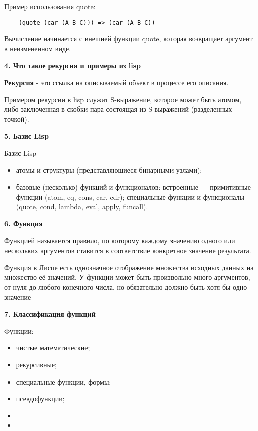 Пример использования quote:
\begin{lstlisting}
	(quote (car (A B C))) => (car (A B C))
\end{lstlisting}


Вычисление начинается с внешней функции quote, которая возвращает аргумент в неизмененном виде.

\textbf{4. Что такое рекурсия и примеры из lisp}

\textbf{Рекурсия} - это ссылка на описываемый объект в процессе его описания.

Примером рекурсии в lisp служит S-выражение, которое может быть атомом,
либо заключенная в скобки пара состоящая из S-выражений (разделенных точкой).


\textbf{5. Базис Lisp}

Базис Lisp 
\begin{itemize}
	\item атомы и структуры (представляющиеся бинарными узлами);
	\item базовые (несколько) функций и функционалов: встроенные — примитивные
	функции (atom, eq, cons, car, cdr); специальные функции и функционалы (quote,
	cond, lambda, eval, apply, funcall).
\end{itemize}

\textbf{6. Функция}

Функцией называется правило, по которому каждому значению одного или нескольких аргументов ставится в соответствие конкретное значение результата.

Функция в Лиспе есть однозначное отображение множества исходных данных на множество её значений. У функции может быть произвольно много аргументов, от нуля до любого конечного числа, но обязательно должно быть хотя бы одно значение

\textbf{7. Классификация функций}

Функции: 
\begin{itemize}
	\item чистые математические;
	\item рекурсивные;
	\item специальные функции, формы;
	\item псевдофункции;
	\item 
	\item 
\end{itemize}

